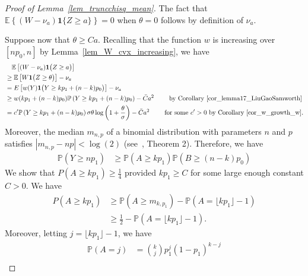 \documentclass{article}
\newcommand{\one}{\mathbf{1}}
\begin{document}
\begin{proof}[Proof of Lemma~\ref{lem_truncchisq_mean}]
    The fact that $\mathbb{E}\left\{\left(W-\nu_{a}\right) \one{\{Z \geq a\}}\right\}=0$ when $\theta=0$ follows by definition of $\nu_{a}$. 
    
    Suppose now that $\theta \geq C a$. %
    Recalling that the function $w$ is increasing over $[np_0,n]$ by Lemma~\ref{lem_W_cvx_increasing}, we have
    \begin{align*}
        &\quad \mathbb E \left[(W- \nu_a) \one{\big(Z \geq a\big)}\right] \\
        & \geq \mathbb E \left[W \one{\big(Z \geq \theta\big)}\right] - \nu_a\\
        & = E \left[w(Y) \one{\big(Y \geq kp_1 + (n-k)p_0\big)}\right] - \nu_a\\
        & \geq w(kp_1 + (n-k)p_0) \mathbb P\left(Y \geq kp_1 + (n-k)p_0\right) - \bar C a^2 \qquad \text{ by Corollary~\ref{cor_lemma17_LiuGaoSamworth}}\\
        & = c'\mathbb P\left(Y \geq kp_1 + (n-k)p_0\right)\sigma \theta \log\left(1+ \frac{\theta}{\sigma}\right) - \bar C a^2 \qquad \text{ for some $c'>0$ by Corollary~\ref{cor_w_growth_w}.}
    \end{align*}
    Moreover, the median $m_{n,p}$ of a binomial distribution with parameters $n$ and $p$ satisfies $|m_{n,p} - np|< \log(2)$ (see~\cite{HAMZA199521}, Theorem 2). 
    Therefore, we have
    \begin{align*}
        \mathbb P\left(Y \geq np_1\right) & \geq \mathbb P\left(A \geq kp_1\right)\mathbb P\left(B \geq (n-k)p_0\right) 
    \end{align*}
    We show that $P\left(A \geq kp_1\right) \geq \frac{1}{4}$ provided $kp_1 \geq C$ for some large enough constant $C>0$. 
    We have
    \begin{align*}
        P\left(A \geq kp_1\right)&\geq \mathbb P\left(A \geq m_{k,p_1}\right) - \mathbb P\left(A = \lfloor kp_1\rfloor - 1\right)\\
        & \geq \frac{1}{2} - \mathbb P\left(A = \lfloor kp_1\rfloor - 1\right) .
    \end{align*}
    Moreover, letting $j = \lfloor kp_1\rfloor - 1$, we have
    \begin{align*}
        \mathbb P\left(A = j\right) &= {k \choose j} p_1^j (1-p_1)^{k-j} \\

\end{align*}
\end{proof}
\end{document}
